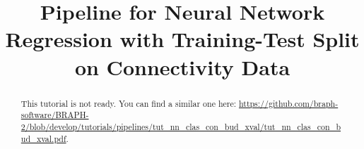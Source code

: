 \documentclass[justified]{tufte-handout}
\title[Regression Training-Test Split Connectivity Data]{Pipeline for Neural Network Regression with Training-Test Split on Connectivity Data}
\begin{document}
\maketitle

\begin{abstract}
\noindent
This tutorial is not ready. You can find a similar one here: \url{https://github.com/braph-software/BRAPH-2/blob/develop/tutorials/pipelines/tut_nn_clas_con_bud_xval/tut_nn_clas_con_bud_xval.pdf}.
\end{abstract}
\end{document}
